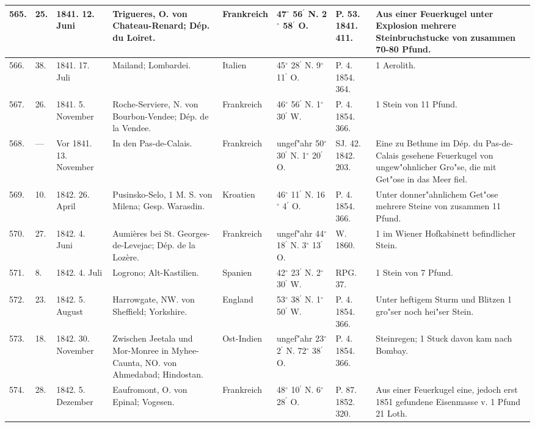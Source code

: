 \documentclass[a4paper, 8pt, oneside, polutonikogreek, german]{article}
\begin{document}
\begin{center}
\begin{longtable}{| p{4mm} | p{2mm} | p{15mm} | p{25mm} | p{16mm} | p{12mm} | p{13mm} | p{20mm} |}
        565. & 25. & 1841. 12. Juni & Trigueres, O. von Chateau-Renard; Dép. du Loiret. & Frankreich & 47$^\circ$ 56$^\prime$ N. 2$^\circ$ 58$^\prime$ O. & P. 53. 1841. 411. & Aus einer Feuerkugel unter Explosion mehrere Steinbruchstucke von zusammen 70-80 Pfund. \\ \hline
        566. & 38. & 1841. 17. Juli & Mailand; Lombardei. & Italien & 45$^\circ$ 28$^\prime$ N. 9$^\circ$ 11$^\prime$ O. & P. 4. 1854. 364. & 1 Aerolith. \\ \hline
        567. & 26. & 1841. 5. November & Roche-Serviere, N. von Bourbon-Vendee; Dép. de la Vendee. & Frankreich & 46$^\circ$ 56$^\prime$ N. 1$^\circ$ 30$^\prime$ W. & P. 4. 1854. 366. & 1 Stein von 11 Pfund. \\ \hline
        568. & --- & Vor 1841. 13. November & In den Pas-de-Calais. & Frankreich & ungef"ahr 50$^\circ$ 30$^\prime$ N. 1$^\circ$ 20$^\prime$ O. & SJ. 42. 1842. 203. & Eine zu Bethune im Dép. du Pas-de-Calais gesehene Feuerkugel von ungew"ohnlicher Gro"se, die mit Get"ose in das Meer fiel. \\ \hline
        569. & 10. & 1842. 26. April & Pusinsko-Selo, 1 M. S. von Milena; Gesp. Warasdin. & Kroatien & 46$^\circ$ 11$^\prime$ N. 16$^\circ$ 4$^\prime$ O. & P. 4. 1854. 366. & Unter donner"ahnlichem Get"ose mehrere Steine von zusammen 11 Pfund. \\ \hline
        570. & 27. & 1842. 4. Juni & Aumières bei St. Georges-de-Levejac; Dép. de la Lozère. & Frankreich & ungef"ahr 44$^\circ$ 18$^\prime$ N. 3$^\circ$ 13$^\prime$ O. & W. 1860. & 1 im Wiener Hofkabinett befindlicher Stein. \\ \hline
        571. & 8. & 1842. 4. Juli & Logrono; Alt-Kastilien. & Spanien & 42$^\circ$ 23$^\prime$ N. 2$^\circ$ 30$^\prime$ W. & RPG. 37. & 1 Stein von 7 Pfund. \\ \hline
        572. & 23. & 1842. 5. August & Harrowgate, NW. von Sheffield; Yorkshire. & England & 53$^\circ$ 38$^\prime$ N. 1$^\circ$ 50$^\prime$ W. & P. 4. 1854. 366. & Unter heftigem Sturm und Blitzen 1 gro"ser noch hei"ser Stein. \\ \hline
        573. & 18. & 1842. 30. November & Zwischen Jeetala und Mor-Monree in Myhee-Caunta, NO. von Ahmedabad; Hindostan. & Ost-Indien & ungef"ahr 23$^\circ$ 2$^\prime$ N. 72$^\circ$ 38$^\prime$ O. & P. 4. 1854. 366. & Steinregen; 1 Stuck davon kam nach Bombay. \\ \hline
        574. & 28. & 1842. 5. Dezember & Eaufromont, O. von Epinal; Vogesen. & Frankreich & 48$^\circ$ 10$^\prime$ N. 6$^\circ$ 28$^\prime$ O. & P. 87. 1852. 320. & Aus einer Feuerkugel eine, jedoch erst 1851 gefundene Eisenmasse v. 1 Pfund 21 Loth. \\ \hline

\end{longtable}
\end{center}
\end{document}
